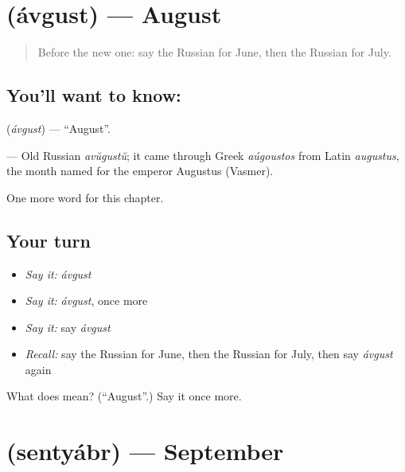 \section[\texorpdfstring{\ru{август} (ávgust)}{август (ávgust)}]{ (ávgust) — August}

\label{lesson:RU-C212-avgust}



\begin{quote}
Before the new one: say the Russian for June, then the Russian for July.
\end{quote}

\subsection*{You'll want to know: }
\textbf{} (\emph{ávgust}) — \textquotedblleft{}August\textquotedblright{}.

\begin{cousinweb}
\textbf{} — Old Russian \emph{avŭgustŭ}; it came through Greek \emph{aúgoustos} from Latin \emph{augustus}, the month named for the emperor Augustus (Vasmer).
\end{cousinweb}

\begin{grammarlens}[title={What you've built}]
One more word for this chapter.
\end{grammarlens}

\subsection*{Your turn}
\begin{itemize}
\raggedright
  \item \emph{Say it:} \emph{ávgust}
  \item \emph{Say it:} \emph{ávgust}, once more
  \item \emph{Say it:} say \emph{ávgust}
  \item \emph{Recall:} say the Russian for June, then the Russian for July, then say \emph{ávgust} again
\end{itemize}

\begin{tcolorbox}[breakable,colback=teal!4,colframe=teal!35!black,title={Before you move on}]
What does  mean? (\textquotedblleft{}August\textquotedblright{}.) Say it once more.
\end{tcolorbox}
\section[\texorpdfstring{\ru{сентябрь} (sentyábr)}{сентябрь (sentyábr)}]{ (sentyábr) — September}

